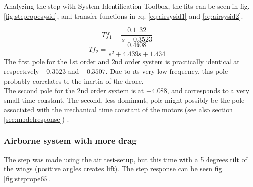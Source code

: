Analyzing the step with System Identification Toolbox, the fits can be seen in fig. \ref{fig:stepropesysid}, and transfer functions in eq. \ref{eq:airsysid1} and \ref{eq:airsysid2}.

\begin{equation}\label{eq:airsysid1}
    Tf_1 = \frac{0.1132}{s+0.3523}
\end{equation}
\begin{equation}\label{eq:airsysid2}
    Tf_2 = \frac{0.4608}{s^2 + 4.439s+1.434}
\end{equation}
The first pole for the 1st order and 2nd order system is practically identical at respectively $-0.3523$ and $-0.3507$. Due to its very low frequency, this pole probably correlates to the inertia of the drone. \\
The second pole for the 2nd order system is at $-4.088$, and corresponds to a very small time constant. The second, less dominant, pole might possibly be the pole associated with the mechanical time constant of the motors \cite{motordata} (see also section \ref{sec:modelresponse}) .

\subsubsection{Airborne system with more drag}
The step was made using the air test-setup, but this time with a 5 degrees tilt of the wings (positive angles creates lift). The step response can be seen fig. \ref{fig:steprope65}.


